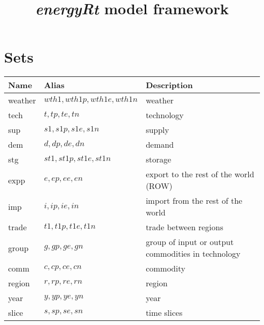 \documentclass{article}
\title{\emph{energyRt} model framework}
\begin{document}
\maketitle
\section*{Sets}
\begin{longtable}{| l | l | l |}
\hline
\bf{Name} & \bf{Alias} & \bf{Description} \\ 
 \hline
weather & $wth1,wth1p,wth1e,wth1n$ & weather \\ 
 \hline
tech & $t,tp,te,tn$ & technology \\ 
 \hline
sup & $s1,s1p,s1e,s1n$ & supply \\ 
 \hline
dem & $d,dp,de,dn$ & demand \\ 
 \hline
stg & $st1,st1p,st1e,st1n$ & storage \\ 
 \hline
expp & $e,ep,ee,en$ & export to the rest of the world (ROW) \\ 
 \hline
imp & $i,ip,ie,in$ & import from the rest of the world \\ 
 \hline
trade & $t1,t1p,t1e,t1n$ & trade between regions \\ 
 \hline
group & $g,gp,ge,gn$ & group of input or output commodities in technology \\ 
 \hline
comm & $c,cp,ce,cn$ & commodity \\ 
 \hline
region & $r,rp,re,rn$ & region \\ 
 \hline
year & $y,yp,ye,yn$ & year \\ 
 \hline
slice & $s,sp,se,sn$ & time slices \\ 
 \hline
\end{longtable}
\end{document}
